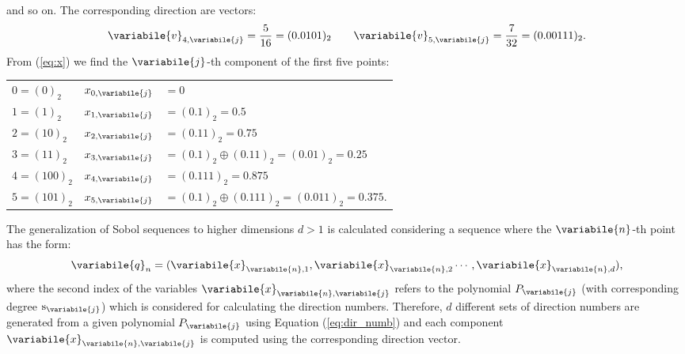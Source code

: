 and so on. The corresponding direction are vectors:
\begin{equation}
\variabile{v}_{4,\variabile{j}} = \frac{5}{16} = (0.0101)_2  \qquad \variabile{v}_{5,\variabile{j}} = \frac{7}{32}=(0.00111)_2.
\end{equation}
From (\ref{eq:x}) we find the $\variabile{j}$-th component of the first five points:
\begin{center}
\begin{tabular}{ l l l}
 $0 = (0)_2$  & $x_{0, \variabile{j}}$ & $= 0$ \\ 
 $1 = (1)_2$ & $x_{1, \variabile{j}}$ & $= (0.1)_2 = 0.5$ \\  
 $2 = (10)_2$ & $x_{2, \variabile{j}}$ & $= (0.11)_2= 0.75$  \\
$3 = (11)_2$ & $x_{3, \variabile{j}}$ & $ = (0.1)_2\oplus (0.11)_2 = (0.01)_2 = 0.25$\\
$4 = (100)_2$ & $x_{4, \variabile{j}}$ & $ = (0.111)_2= 0.875$\\
$5 = (101)_2$ & $x_{5, \variabile{j}}$ & $ = (0.1)_2\oplus (0.111)_2 = (0.011)_2 = 0.375$.
\end{tabular}
\end{center}
The generalization of Sobol sequences to higher dimensions $d>1$ is calculated considering a sequence where the $\variabile{n}$-th point has the form:
\begin{equation}
\variabile{q}_{n} = (\variabile{x}_{\variabile{n}, 1},\variabile{x}_{\variabile{n}, 2} \cdots, \variabile{x}_{\variabile{n}, d}),
\end{equation}
where the second index of the variables $\variabile{x}_{\variabile{n}, \variabile{j}}$ refers to the polynomial $P_{\variabile{j}}$ (with corresponding degree $\textrm{s}_{\variabile{j}}$) which is considered for calculating the direction numbers. Therefore, $d$ different sets of direction numbers are generated from a given polynomial $P_\variabile{j}$ using Equation (\ref{eq:dir_numb}) and each component $\variabile{x}_{\variabile{n},\variabile{j}}$ is computed using the corresponding direction vector. 